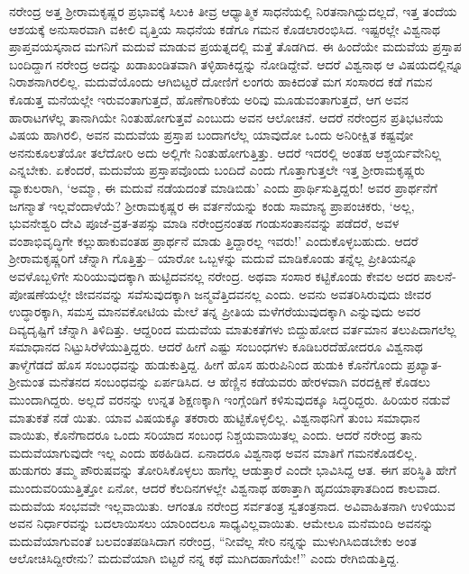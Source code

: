 ನರೇಂದ್ರ ಅತ್ತ ಶ್ರೀರಾಮಕೃಷ್ಣರ ಪ್ರಭಾವಕ್ಕೆ ಸಿಲುಕಿ ತೀವ್ರ ಆಧ್ಯಾತ್ಮಿಕ ಸಾಧನೆಯಲ್ಲಿ ನಿರತನಾಗಿದ್ದುದಲ್ಲದೆ, ಇತ್ತ ತಂದೆಯ ಆಶಯಕ್ಕೆ ಅನುಸಾರವಾಗಿ ವಕೀಲಿ ವೃತ್ತಿಯ ಸಾಧನೆಯ ಕಡೆಗೂ ಗಮನ ಕೊಡಲಾರಂಭಿಸಿದ. ಇಷ್ಟರಲ್ಲೇ ವಿಶ್ವನಾಥ ಪ್ರಾಪ್ತವಯಸ್ಕನಾದ ಮಗನಿಗೆ ಮದುವೆ ಮಾಡುವ ಪ್ರಯತ್ನದಲ್ಲಿ ಮತ್ತೆ ತೊಡಗಿದ. ಈ ಹಿಂದೆಯೇ ಮದುವೆಯ ಪ್ರಸ್ತಾಪ ಬಂದಿದ್ದಾಗ ನರೇಂದ್ರ ಅದನ್ನು ಖಡಾಖಂಡಿತವಾಗಿ ತಳ್ಳಿಹಾಕಿದ್ದನ್ನು ನೋಡಿದ್ದೇವೆ. ಆದರೆ ವಿಶ್ವನಾಥ ಆ ವಿಷಯದಲ್ಲಿನ್ನೂ ನಿರಾಶನಾಗಿರಲಿಲ್ಲ. ಮದುವೆಯೊಂದು ಆಗಿಬಿಟ್ಟರೆ ದೋಣಿಗೆ ಲಂಗರು ಹಾಕಿದಂತೆ ಮಗ ಸಂಸಾರದ ಕಡೆ ಗಮನ ಕೊಡುತ್ತ ಮನೆಯಲ್ಲೇ ಇರುವಂತಾಗುತ್ತದೆ, ಹೊಣೆಗಾರಿಕೆಯ ಅರಿವು ಮೂಡುವಂತಾಗುತ್ತದೆ, ಆಗ ಅವನ ಹಾರಾಟಗಳೆಲ್ಲ ತಾನಾಗಿಯೇ ನಿಂತುಹೋಗುತ್ತವೆ ಎಂಬುದು ಅವನ ಆಲೋಚನೆ. ಆದರೆ ನರೇಂದ್ರನ ಪ್ರತಿಭಟನೆಯ ವಿಷಯ ಹಾಗಿರಲಿ, ಅವನ ಮದುವೆಯ ಪ್ರಸ್ತಾಪ ಬಂದಾಗಲೆಲ್ಲ ಯಾವುದೋ ಒಂದು ಅನಿರೀಕ್ಷಿತ ಕಷ್ಟವೋ ಅನನುಕೂಲತೆಯೋ ತಲೆದೋರಿ ಅದು ಅಲ್ಲಿಗೇ ನಿಂತುಹೋಗುತ್ತಿತ್ತು. ಆದರೆ ಇದರಲ್ಲಿ ಅಂತಹ ಆಶ್ಚರ್ಯವೇನಿಲ್ಲ ಎನ್ನಬೇಕು. ಏಕೆಂದರೆ, ಮದುವೆಯ ಪ್ರಸ್ತಾಪವೊಂದು ಬಂದಿದೆ ಎಂದು ಗೊತ್ತಾಗುತ್ತಲೇ ಇತ್ತ ಶ್ರೀರಾಮಕೃಷ್ಣರು ವ್ಯಾಕುಲರಾಗಿ, ‘ಅಮ್ಮಾ, ಈ ಮದುವೆ ನಡೆಯದಂತೆ ಮಾಡಿಬಿಡು’ ಎಂದು ಪ್ರಾರ್ಥಿಸುತ್ತಿದ್ದರು! ಅವರ ಪ್ರಾರ್ಥನೆಗೆ ಜಗನ್ಮಾತೆ ಇಲ್ಲವೆಂದಾಳೆಯೆ? ಶ್ರೀರಾಮಕೃಷ್ಣರ ಈ ವರ್ತನೆಯನ್ನು ಕಂಡು ಸಾಮಾನ್ಯ ಪ್ರಾಪಂಚಿಕರು, ‘ಅಲ್ಲ, ಭುವನೇಶ್ವರಿ ದೇವಿ ಪೂಜೆ-ವ್ರತ-ತಪಸ್ಸು ಮಾಡಿ ನರೇಂದ್ರನಂತಹ ಗಂಡುಸಂತಾನವನ್ನು ಪಡೆದರೆ, ಅವಳ ವಂಶಾಭಿವೃದ್ಧಿಗೇ ಕಲ್ಲುಹಾಕುವಂತಹ ಪ್ರಾರ್ಥನೆ ಮಾಡು ತ್ತಿದ್ದಾರಲ್ಲ ಇವರು!’ ಎಂದುಕೊಳ್ಳಬಹುದು. ಆದರೆ ಶ್ರೀರಾಮಕೃಷ್ಣರಿಗೆ ಚೆನ್ನಾಗಿ ಗೊತ್ತಿತ್ತು– ಯಾರೋ ಒಬ್ಬಳನ್ನು ಮದುವೆ ಮಾಡಿಕೊಂಡು ತನ್ನೆಲ್ಲ ಪ್ರೀತಿಯನ್ನೂ ಅವಳೊಬ್ಬಳಿಗೇ ಸುರಿಯುವುದಕ್ಕಾಗಿ ಹುಟ್ಟಿದವನಲ್ಲ ನರೇಂದ್ರ. ಅಥವಾ ಸಂಸಾರ ಕಟ್ಟಿಕೊಂಡು ಕೇವಲ ಅದರ ಪಾಲನೆ-ಪೋಷಣೆಯಲ್ಲೇ ಜೀವನವನ್ನು ಸವೆಸುವುದಕ್ಕಾಗಿ ಜನ್ಮವೆತ್ತಿದವನಲ್ಲ ಎಂದು. ಅವನು ಅವತರಿಸಿರುವುದು ಜೀವರ ಉದ್ಧಾರಕ್ಕಾಗಿ, ಸಮಸ್ತ ಮಾನವಕೋಟಿಯ ಮೇಲೆ ತನ್ನ ಪ್ರೀತಿಯ ಮಳೆಗರೆಯುವುದಕ್ಕಾಗಿ ಎನ್ನುವುದು ಅವರ ದಿವ್ಯದೃಷ್ಟಿಗೆ ಚೆನ್ನಾಗಿ ತಿಳಿದಿತ್ತು. ಆದ್ದರಿಂದ ಮದುವೆಯ ಮಾತುಕತೆಗಳು ಬಿದ್ದುಹೋದ ವರ್ತಮಾನ ತಲುಪಿದಾಗಲೆಲ್ಲ ಸಮಾಧಾನದ ನಿಟ್ಟುಸಿರೆಳೆಯುತ್ತಿದ್ದರು. ಆದರೆ ಹೀಗೆ ಎಷ್ಟು ಸಂಬಂಧಗಳು ಕೂಡಿಬರದೆಹೋದರೂ ವಿಶ್ವನಾಥ ತಾಳ್ಮೆಗೆಡದೆ ಹೊಸ ಸಂಬಂಧವನ್ನು ಹುಡುಕುತ್ತಿದ್ದ. ಹೀಗೆ ಹೊಸ ಹುರುಪಿನಿಂದ ಹುಡುಕಿ ಕೊನೆಗೊಂದು ಪ್ರಖ್ಯಾತ-ಶ್ರೀಮಂತ ಮನೆತನದ ಸಂಬಂಧವನ್ನು ಏರ್ಪಡಿಸಿದ. ಆ ಹೆಣ್ಣಿನ ಕಡೆಯವರು ಹೇರಳವಾಗಿ ವರದಕ್ಷಿಣೆ ಕೊಡಲು ಮುಂದಾಗಿದ್ದರು. ಅಲ್ಲದೆ ವರನನ್ನು ಉನ್ನತ ಶಿಕ್ಷಣಕ್ಕಾಗಿ ಇಂಗ್ಲೆಂಡಿಗೆ ಕಳಿಸುವುದಕ್ಕೂ ಸಿದ್ಧರಿದ್ದರು. ಹಿರಿಯರ ನಡುವೆ ಮಾತುಕತೆ ನಡೆ ಯಿತು. ಯಾವ ವಿಷಯಕ್ಕೂ ತಕರಾರು ಹುಟ್ಟಿಕೊಳ್ಳಲಿಲ್ಲ. ವಿಶ್ವನಾಥನಿಗೆ ತುಂಬ ಸಮಾಧಾನ ವಾಯಿತು, ಕೊನೆಗಾದರೂ ಒಂದು ಸರಿಯಾದ ಸಂಬಂಧ ನಿಶ್ಚಯವಾಯಿತಲ್ಲ ಎಂದು. ಆದರೆ ನರೇಂದ್ರ ತಾನು ಮದುವೆಯಾಗುವುದೇ ಇಲ್ಲ ಎಂದು ಹಠಹಿಡಿದ. ಏನಾದರೂ ವಿಶ್ವನಾಥ ಅವನ ಮಾತಿಗೆ ಗಮನಕೊಡಲಿಲ್ಲ. ಹುಡುಗರು ತಮ್ಮ ಪೌರುಷವನ್ನು ತೋರಿಸಿಕೊಳ್ಳಲು ಹಾಗೆಲ್ಲ ಆಡುತ್ತಾರೆ ಎಂದೇ ಭಾವಿಸಿದ್ದ ಆತ. ಈಗ ಪರಿಸ್ಥಿತಿ ಹೇಗೆ ಮುಂದುವರಿಯುತ್ತಿತ್ತೋ ಏನೋ, ಆದರೆ ಕೆಲದಿನಗಳಲ್ಲೇ ವಿಶ್ವನಾಥ ಹಠಾತ್ತಾಗಿ ಹೃದಯಾಘಾತದಿಂದ ಕಾಲವಾದ. ಮದುವೆಯ ಸಂಭವವೇ ಇಲ್ಲವಾಯಿತು. ಆಗಂತೂ ನರೇಂದ್ರ ಸರ್ವತಂತ್ರ ಸ್ವತಂತ್ರನಾದ. ಅವಿವಾಹಿತನಾಗಿ ಉಳಿಯುವ ಅವನ ನಿರ್ಧಾರವನ್ನು ಬದಲಾಯಿಸಲು ಯಾರಿಂದಲೂ ಸಾಧ್ಯವಿಲ್ಲವಾಯಿತು. ಆಮೇಲೂ ಮನೆಮಂದಿ ಅವನನ್ನು ಮದುವೆಯಾಗುವಂತೆ ಬಲವಂತಪಡಿಸಿದಾಗ ನರೇಂದ್ರ, “ನೀವೆಲ್ಲ ಸೇರಿ ನನ್ನನ್ನು ಮುಳುಗಿಸಿಬಿಡಬೇಕು ಅಂತ ಆಲೋಚಿಸಿದ್ದೀರೇನು? ಮದುವೆಯಾಗಿ ಬಿಟ್ಟರೆ ನನ್ನ ಕಥೆ ಮುಗಿದಹಾಗೆಯೇ!” ಎಂದು ರೇಗಿಬಿಡುತ್ತಿದ್ದ.

